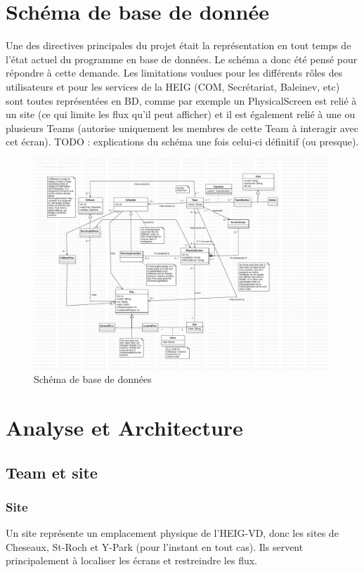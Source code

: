 \documentclass[french]{article}
\begin{document}
\newpage
\section{Schéma de base de donnée}
Une des directives principales du projet était la représentation en tout temps de l'état actuel du programme en base de données. Le schéma a donc été pensé pour répondre à cette demande. Les limitations voulues pour les différents rôles des utilisateurs et pour les services de la HEIG (COM, Secrétariat, Baleinev, etc) sont toutes représentées en BD, comme par exemple un PhysicalScreen est relié à un site (ce qui limite les flux qu'il peut afficher) et il est également relié à une ou plusieurs Teams (autorise uniquement les membres de cette Team à interagir avec cet écran).
\newline TODO : explications du schéma une fois celui-ci définitif (ou presque).

	\begin{figure}[h]
		\centering
		\includegraphics[scale=0.5]{db_schema}
		\caption{Schéma de base de données}
	\end{figure}

\newpage
\section{Analyse et Architecture}

\subsection{Team et site}

\subsubsection{Site}
Un site représente un emplacement physique de l'HEIG-VD, donc les sites de Cheseaux, St-Roch et Y-Park (pour l'instant en tout cas). Ils servent principalement à localiser les écrans et restreindre les flux. 
\end{document}
